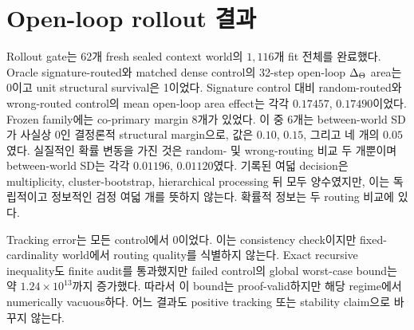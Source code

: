 \section{Open-loop rollout 결과}
\label{sec:rollout-results}

Rollout gate는 62개 fresh sealed context world의 \(1{,}116\)개 fit 전체를
완료했다. Oracle signature-routed와 matched dense control의 32-step
open-loop \(\Delta_{\Theta}\) area는 0이고 unit structural survival은 1이었다.
Signature control 대비 random-routed와 wrong-routed control의 mean open-loop
area effect는 각각 \(0.17457\), \(0.17490\)이었다. Frozen family에는 co-primary
margin 8개가 있었다. 이 중 6개는 between-world SD가 사실상 0인 결정론적
structural margin으로, 값은 \(0.10\), \(0.15\), 그리고 네 개의 \(0.05\)였다.
실질적인 확률 변동을 가진 것은 random- 및 wrong-routing 비교 두 개뿐이며
between-world SD는 각각 \(0.01196\), \(0.01120\)였다. 기록된 여덟 decision은
multiplicity, cluster-bootstrap, hierarchical processing 뒤 모두 양수였지만, 이는
독립적이고 정보적인 검정 여덟 개를 뜻하지 않는다. 확률적 정보는 두 routing
비교에 있다.

Tracking error는 모든 control에서 0이었다. 이는 consistency check이지만
fixed-cardinality world에서 routing quality를 식별하지 않는다. Exact recursive
inequality도 finite audit를 통과했지만 failed control의 global worst-case
bound는 약 \(1.24\times 10^{13}\)까지 증가했다. 따라서 이 bound는
proof-valid하지만 해당 regime에서 numerically vacuous하다. 어느 결과도
positive tracking 또는 stability claim으로 바꾸지 않는다.
